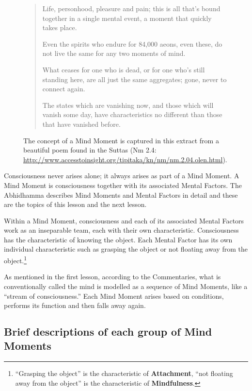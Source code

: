 \begin{figure} [H]

\vspace{-1mm}

\begin{quote}
Life, personhood, pleasure and pain; this is all that's bound together in a single mental event, a moment that quickly takes place.

Even the spirits who endure for 84,000 aeons, even these, do not live the same for any two moments of mind.

What ceases for one who is dead, or for one who's still standing here, are all just the same aggregates; gone, never to connect again.

The states which are vanishing now, and those which will vanish some day, have characteristics no different than those that have vanished before.

\end{quote}

\caption{The concept of a Mind Moment is captured in this extract from a beautiful poem found in the Suttas (Nm 2.4: \url{http://www.accesstoinsight.org/tipitaka/kn/nm/nm.2.04.olen.html}).}

\end{figure}

Consciousness never arises alone; it always arises as part of a Mind Moment. A Mind Moment is consciousness together with its associated Mental Factors. The Abhidhamma describes Mind Moments and Mental Factors in detail and these are the topics of this lesson and the next lesson.

\pagebreak

Within a Mind Moment, consciousness and each of its associated Mental Factors work as an inseparable team, each with their own characteristic. Consciousness has the characteristic of knowing the object. Each Mental Factor has its own individual characteristic such as grasping the object or not floating away from the object.\footnote{“Grasping the object” is the characteristic of \textbf{Attachment}, “not floating away from the object” is the characteristic of \textbf{Mindfulness}.}

As mentioned in the first lesson, according to the Commentaries, what is conventionally called the mind is modelled as a sequence of Mind Moments, like a “stream of consciousness.” Each Mind Moment arises based on conditions, performs its function and then falls away again.

\subsection*{Brief descriptions of each group of Mind Moments}

